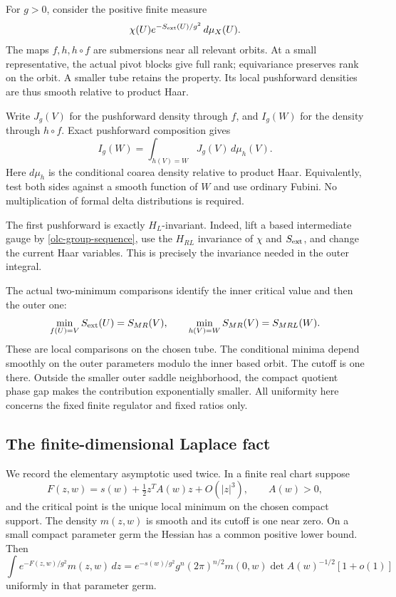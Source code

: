 For $g>0$, consider the positive finite measure
\begin{equation}
              \chi(U)e^{-S_{\rm ext}(U)/g^2}\,d\mu_X(U).
 \label{olc-tube-measure}
\end{equation}
The maps $f,h,h\circ f$ are submersions near all relevant
orbits. At a small representative, the actual pivot blocks
give full rank; equivariance preserves rank on the orbit.
A smaller tube retains the property. Its local pushforward
densities are thus smooth relative to product Haar.

Write $J_g(V)$ for the pushforward density through $f$, and
$I_g(W)$ for the density through $h\circ f$. Exact
pushforward composition gives
\begin{equation}
                I_g(W)=\int_{h(V)=W}J_g(V)\,d\mu_h(V).
 \label{olc-Fubini}
\end{equation}
Here $d\mu_h$ is the conditional coarea density relative to
product Haar. Equivalently, test both sides against a smooth
function of $W$ and use ordinary Fubini. No multiplication
of formal delta distributions is required.

The first pushforward is exactly $H_L$-invariant. Indeed,
lift a based intermediate gauge by
\eqref{olc-group-sequence}, use the $H_{RL}$ invariance of
$\chi$ and $S_{\rm ext}$, and change the current Haar variables.
This is precisely the invariance needed in the outer integral.

The actual two-minimum comparisons identify the inner
critical value and then the outer one:
\begin{equation}
 \min_{f(U)=V}S_{\rm ext}(U)=S_{MR}(V),\qquad
 \min_{h(V)=W}S_{MR}(V)=S_{MRL}(W).
 \label{olc-minimum-values}
\end{equation}
These are local comparisons on the chosen tube.
The conditional minima depend smoothly on the outer
parameters modulo the inner based orbit. The cutoff is one
there. Outside the smaller outer saddle neighborhood, the
compact quotient phase gap makes the contribution
exponentially smaller. All uniformity here concerns the
fixed finite regulator and fixed ratios only.

\subsection{The finite-dimensional Laplace fact}
\label{olc-Laplace-section}

We record the elementary asymptotic used twice. In a finite
real chart suppose
\[
 F(z,w)=s(w)+\tfrac12z^TA(w)z+O(|z|^3),\qquad A(w)>0,
\]
and the critical point is the unique local minimum on the
chosen compact support. The density $m(z,w)$ is smooth and
its cutoff is one near zero. On a small compact parameter
germ the Hessian has a common positive lower bound. Then
\begin{equation}
 \int e^{-F(z,w)/g^2}m(z,w)\,dz
  =e^{-s(w)/g^2}g^n(2\pi)^{n/2}
        m(0,w)\det A(w)^{-1/2}[1+o(1)]
 \label{olc-Laplace}
\end{equation}
uniformly in that parameter germ.

